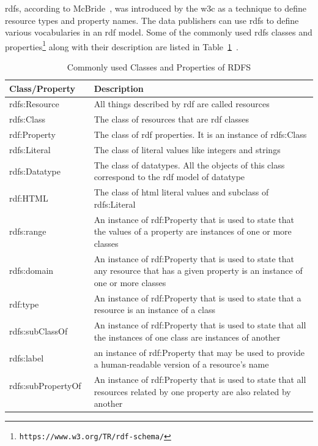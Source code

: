 \begin{doublespace}
\ac{rdfs}, 
according to McBride~\cite{mcbride2004resource}, 
was introduced by the \ac{w3c} 
as a technique to define resource types and property names. 
The data publishers can use \ac{rdfs} 
to define various vocabularies in an \ac{rdf} model. 
Some of the commonly used \ac{rdfs} 
classes and properties\footnote{\tt https://www.w3.org/TR/rdf-schema/} 
along with their description 
are listed in Table~\ref{rdfs-classes-and-properties}~\cite{mcbride2004resource}.

\begin{table}[h!]
	\centering
	
	\caption{Commonly used Classes and Properties of RDFS}
    \label{rdfs-classes-and-properties}
    
    \begin{tabular}{| l | p{10cm} |} \hline
		Class/Property & Description  \\  \hline
     rdfs:Resource & All things described by \ac{rdf} are called resources  \\ \hline
     rdfs:Class & The class of resources that are \ac{rdf} classes \\ \hline
     rdf:Property & The class of \ac{rdf} properties. 
     It is an instance of rdfs:Class  \\ \hline
     rdfs:Literal & The class of literal values like integers and strings  \\ \hline
     rdfs:Datatype & The class of datatypes. 
     All the objects of this class correspond to the \ac{rdf} model of datatype  \\ \hline
     rdf:HTML & The class of \ac{html} literal values and subclass of rdfs:Literal  \\ \hline
     rdfs:range & An instance of rdf:Property that is used to state that 
     the values of a property are instances of one or more classes \\ \hline
     rdfs:domain & An instance of rdf:Property that is used to state that 
     any resource that has a given property is an instance of one or more classes \\ \hline
     rdf:type & An instance of rdf:Property that is used to state that 
     a resource is an instance of a class  \\ \hline
     rdfs:subClassOf & An instance of rdf:Property that is used to state that 
     all the instances of one class are instances of another  \\ \hline
     rdfs:label & an instance of rdf:Property that may be used to provide 
     a human-readable version of a resource's name  \\ \hline
     rdfs:subPropertyOf \ \ & An instance of rdf:Property that is used to state that 
     all resources related by one property are also related by another  \\ \hline
    \end{tabular}
    

\end{table}
\end{doublespace}
